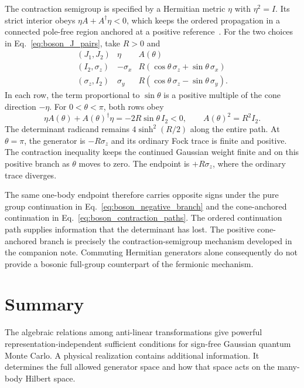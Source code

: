 \documentclass[onecolumn,aps,prb,amsmath,amssymb,superscriptaddress,longbibliography]{revtex4-2}
\begin{document}
The contraction semigroup is specified by a Hermitian metric \(\eta\) with
\(\eta^2=I\).  Its strict interior obeys
\(\eta A+A^\dagger\eta<0\), which keeps the ordered propagation in a connected
pole-free region anchored at a positive reference~\cite{wei2024prb}.  For the
two choices in Eq.~\eqref{eq:boson_J_pairs}, take \(R>0\) and
\begin{equation}
\begin{array}{c|c|c}
(J_1,J_2) & \eta & A(\theta) \\ \hline
(I_2,\sigma_z)
&-\sigma_x
&R(\cos\theta\,\sigma_z+\sin\theta\,\sigma_x)\\
(\sigma_z,I_2)
&\sigma_y
&R(\cos\theta\,\sigma_z-\sin\theta\,\sigma_y).
\end{array}
    \label{eq:boson_contraction_paths}
\end{equation}
In each row, the term proportional to \(\sin\theta\) is a positive multiple of
the cone direction \(-\eta\).
For \(0<\theta<\pi\), both rows obey
\begin{equation}
    \eta A(\theta)+A(\theta)^\dagger\eta
    =-2R\sin\theta\,I_2<0,
    \qquad
    A(\theta)^2=R^2I_2 .
    \label{eq:boson_path_properties}
\end{equation}
The determinant radicand remains
\(4\sinh^2(R/2)\) along the entire path.  At \(\theta=\pi\), the generator is
\(-R\sigma_z\) and its ordinary Fock trace is finite and positive.  The
contraction inequality keeps the continued Gaussian weight finite and on this
positive branch as \(\theta\) moves to zero.  The endpoint is
\(+R\sigma_z\), where the ordinary trace diverges.

The same one-body endpoint therefore carries opposite signs under the pure
group continuation in Eq.~\eqref{eq:boson_negative_branch} and the
cone-anchored continuation in Eq.~\eqref{eq:boson_contraction_paths}.  The
ordered continuation path supplies information that the determinant has
lost.  The positive cone-anchored branch is precisely the contraction-semigroup
mechanism developed in the companion note.  Commuting Hermitian generators
alone consequently do not provide a bosonic full-group counterpart of the
fermionic mechanism.

\section{Summary}

The algebraic relations among anti-linear transformations give powerful
representation-independent sufficient conditions for sign-free Gaussian
quantum Monte Carlo.  A physical realization contains additional information.
It determines the full allowed generator space and how that space acts on the
many-body Hilbert space.
\end{document}
